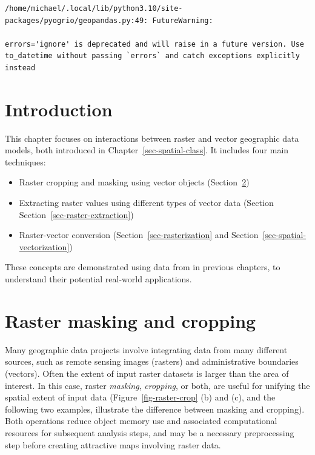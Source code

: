 \documentclass[
  letterpaper,
]{krantz}
\providecommand{\tightlist}{%
  \setlength{\itemsep}{0pt}\setlength{\parskip}{0pt}}\usepackage{longtable,booktabs,array}
\begin{document}
\begin{verbatim}
/home/michael/.local/lib/python3.10/site-packages/pyogrio/geopandas.py:49: FutureWarning:

errors='ignore' is deprecated and will raise in a future version. Use to_datetime without passing `errors` and catch exceptions explicitly instead
\end{verbatim}

\section{Introduction}\label{introduction-4}

This chapter focuses on interactions between raster and vector
geographic data models, both introduced in
Chapter~\ref{sec-spatial-class}. It includes four main techniques:

\begin{itemize}
\tightlist
\item
  Raster cropping and masking using vector objects
  (Section~\ref{sec-raster-cropping})
\item
  Extracting raster values using different types of vector data (Section
  Section~\ref{sec-raster-extraction})
\item
  Raster-vector conversion (Section~\ref{sec-rasterization} and
  Section~\ref{sec-spatial-vectorization})
\end{itemize}

These concepts are demonstrated using data from in previous chapters, to
understand their potential real-world applications.

\section{Raster masking and cropping}\label{sec-raster-cropping}

Many geographic data projects involve integrating data from many
different sources, such as remote sensing images (rasters) and
administrative boundaries (vectors). Often the extent of input raster
datasets is larger than the area of interest. In this case, raster
\emph{masking}, \emph{cropping}, or both, are useful for unifying the
spatial extent of input data (Figure~\ref{fig-raster-crop} (b) and (c),
and the following two examples, illustrate the difference between
masking and cropping). Both operations reduce object memory use and
associated computational resources for subsequent analysis steps, and
may be a necessary preprocessing step before creating attractive maps
involving raster data.
\end{document}
